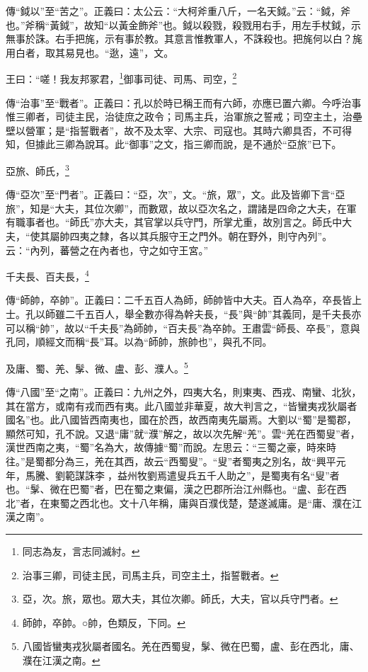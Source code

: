 {\noindent\zhuan{}\fzbyks 傳“鉞以”至“苦之”。正義曰：太公云：“大柯斧重八斤，一名天鉞。”云：“鉞，斧也。”斧稱“黃鉞”，故知“以黃金飾斧”也。鉞以殺戮，殺戮用右手，用左手杖鉞，示無事於誅。右手把旄，示有事於教。其意言惟教軍人，不誅殺也。把旄何以白？旄用白者，取其易見也。“逖，遠”，文。 \par}

王曰：“嗟！我友邦冢君，\footnote{同志為友，言志同滅紂。}御事司徒、司馬、司空，\footnote{治事三卿，司徒主民，司馬主兵，司空主土，指誓戰者。}

{\noindent\zhuan{}\fzbyks 傳“治事”至“戰者”。正義曰：孔以於時已稱王而有六師，亦應已置六卿。今呼治事惟三卿者，司徒主民，治徒庶之政令；司馬主兵，治軍旅之誓戒；司空主土，治壘壁以營軍；是“指誓戰者”，故不及太宰、大宗、司寇也。其時六卿具否，不可得知，但據此三卿為說耳。此“御事”之文，指三卿而說，是不通於“亞旅”已下。 \par}

亞旅、師氏，\footnote{亞，次。旅，眾也。眾大夫，其位次卿。師氏，大夫，官以兵守門者。}

{\noindent\zhuan{}\fzbyks 傳“亞次”至“門者”。正義曰：“亞，次”，文。“旅，眾”，文。此及皆卿下言“亞旅”，知是“大夫，其位次卿”，而數眾，故以亞次名之，謂諸是四命之大夫，在軍有職事者也。“師氏”亦大夫，其官掌以兵守門，所掌尤重，故別言之。師氏中大夫，“使其屬帥四夷之隸，各以其兵服守王之門外。朝在野外，則守內列”。云：“內列，蕃營之在內者也，守之如守王宮。” \par}

千夫長、百夫長，\footnote{師帥，卒帥。○帥，色類反，下同。}

{\noindent\zhuan{}\fzbyks 傳“師帥，卒帥”。正義曰：二千五百人為師，師帥皆中大夫。百人為卒，卒長皆上士。孔以師雖二千五百人，舉全數亦得為幹夫長，“長”與“帥”其義同，是千夫長亦可以稱“帥”，故以“千夫長”為師帥，“百夫長”為卒帥。王肅雲“師長、卒長”，意與孔同，順經文而稱“長”耳。以為“師帥，旅帥也”，與孔不同。 \par}

及庸、蜀、羌、髳、微、盧、彭、濮人。\footnote{八國皆蠻夷戎狄屬者國名。羌在西蜀叟，髳、微在巴蜀，盧、彭在西北，庸、濮在江漢之南。}

{\noindent\zhuan{}\fzbyks 傳“八國”至“之南”。正義曰：九州之外，四夷大名，則東夷、西戎、南蠻、北狄，其在當方，或南有戎而西有夷。此八國並非華夏，故大判言之，“皆蠻夷戎狄屬者國名”也。此八國皆西南夷也，國在於西，故西南夷先屬焉。大劉以“蜀”是蜀郡，顯然可知，孔不說。又退“庸”就“濮”解之，故以次先解“羌”。雲“羌在西蜀叟”者，漢世西南之夷，“蜀”名為大，故傳據“蜀”而說。左思云：“三蜀之豪，時來時往。”是蜀都分為三，羌在其西，故云“西蜀叟”。“叟”者蜀夷之別名，故“興平元年，馬騰、劉範謀誅李𠐶，益州牧劉焉遣叟兵五千人助之”，是蜀夷有名“叟”者也。“髳、微在巴蜀”者，巴在蜀之東偏，漢之巴郡所治江州縣也。“盧、彭在西北”者，在東蜀之西北也。文十八年稱，庸與百濮伐楚，楚遂滅庸。是“庸、濮在江漢之南”。 \par}

